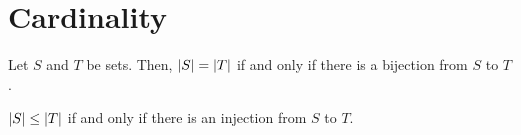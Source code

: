 \chapter{Cardinality}
\begin{definition}[Cardinality]
  Let $S$ and $T$ be sets. Then, $| S | = | T |$ if and only if
  there is a bijection from $S$ to $T$.
\end{definition}

\begin{definition}
  $| S | \leq | T |$ if and only if there is an injection from $S$ to $T$.
\end{definition}

